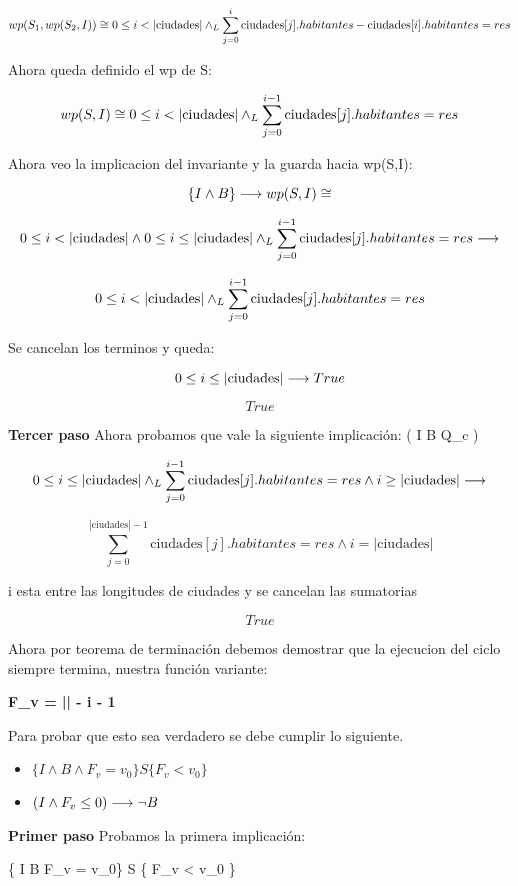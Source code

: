 \documentclass[10pt,a4paper]{article}
\begin{document}
\[
wp(S_1, wp(S_2, I)) \cong 0 \leq i < |\text{ciudades}| \land _L \sum_{j=0}^{i} \text{ciudades}[j].habitantes - \text{ciudades}[i].habitantes = res 
\]

Ahora queda definido el wp de S:

\[
wp(S, I) \cong 0 \leq i < |\text{ciudades}| \land _L \sum_{j=0}^{i-1} \text{ciudades}[j].habitantes = res
\]

Ahora veo la implicacion del invariante y la guarda hacia wp(S,I):

\[
\{I \land B\} \longrightarrow wp(S, I) \cong
\]

\[
 0 \leq i < |\text{ciudades}| \land 0 \leq i \leq |\text{ciudades}| \land _L \sum_{j=0}^{i-1} \text{ciudades}[j].habitantes = res \longrightarrow 
\]

\[
0 \leq i < |\text{ciudades}| \land _L \sum_{j=0}^{i-1} \text{ciudades}[j].habitantes = res
\]

Se cancelan los terminos y queda:

\[
0 \leq i \leq |\text{ciudades}| \longrightarrow True
\]

\[
True
\]

\textbf{Tercer paso} Ahora probamos que vale la siguiente implicación:
( I \land \neg B \implica Q_c )

\[
0 \leq i \leq |\text{ciudades}| \land _L \sum_{j=0}^{i-1} \text{ciudades}[j].habitantes = res \land i \geq |\text{ciudades}| \longrightarrow
\]

\[
 \sum_{j=0}^{|\text{ciudades}|-1} \text{ciudades}[j].habitantes = res \land i = |\text{ciudades}|
\]

i esta entre las longitudes de ciudades y se cancelan las sumatorias

\[
True
\]

Ahora por teorema de terminación debemos demostrar que la ejecucion del ciclo siempre termina, nuestra función variante:

\textbf{F_v = || - i - 1}

Para probar que esto sea verdadero se debe cumplir lo siguiente.

\begin{itemize}
    \item \( \{ I \land B \land F_v = v_0\} S \{ F_v < v_0 \} \)
    \item \( (I \land F_v \leq 0) \longrightarrow \neg B \)
\end{itemize}

\textbf{Primer paso} Probamos la primera implicación:

\{ I \land B \land F_v = v_0\} S \{ F_v < v_0 \}
\end{document}
